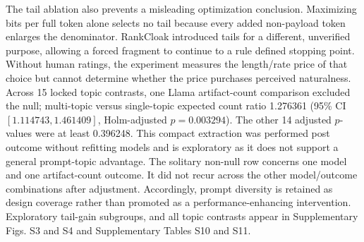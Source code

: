\documentclass[fleqn,10pt]{wlscirep}
\begin{document}
The tail ablation also prevents a misleading optimization conclusion. Maximizing bits per full token alone selects no tail because every added non-payload token enlarges the denominator. RankCloak introduced tails for a different, unverified purpose, allowing a forced fragment to continue to a rule defined stopping point. Without human ratings, the experiment measures the length/rate price of that choice but cannot determine whether the price purchases perceived naturalness.
Across 15 locked topic contrasts, one Llama artifact-count comparison excluded the null; multi-topic versus single-topic expected count ratio 1.276361 (95\% CI \([1.114743, 1.461409]\), Holm-adjusted \(p=0.003294\)). The other 14 adjusted \(p\)-values were at least 0.396248. This compact extraction was performed post outcome without refitting models and is exploratory as it does not support a general prompt-topic advantage.
The solitary non-null row concerns one model and one artifact-count outcome. It did not recur across the other model/outcome combinations after adjustment. Accordingly, prompt diversity is retained as design coverage rather than promoted as a performance-enhancing intervention. Exploratory tail-gain subgroups, and all topic contrasts appear in Supplementary Figs. S3 and S4 and Supplementary Tables S10 and S11.
\end{document}
